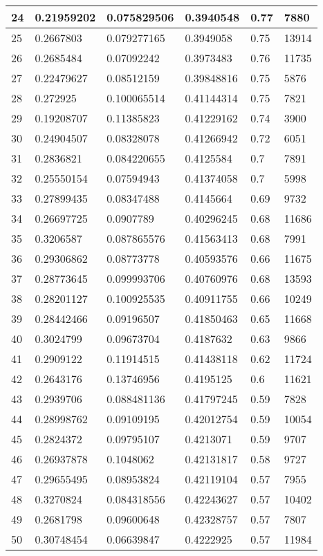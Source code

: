 \begin{longtable}{|l|l|l|l|l|l|}
24 & 0.21959202 & 0.075829506 & 0.3940548 & 0.77 & 7880 \\ \hline 
25 & 0.2667803 & 0.079277165 & 0.3949058 & 0.75 & 13914 \\ \hline 
26 & 0.2685484 & 0.07092242 & 0.3973483 & 0.76 & 11735 \\ \hline 
27 & 0.22479627 & 0.08512159 & 0.39848816 & 0.75 & 5876 \\ \hline 
28 & 0.272925 & 0.100065514 & 0.41144314 & 0.75 & 7821 \\ \hline 
29 & 0.19208707 & 0.11385823 & 0.41229162 & 0.74 & 3900 \\ \hline 
30 & 0.24904507 & 0.08328078 & 0.41266942 & 0.72 & 6051 \\ \hline 
31 & 0.2836821 & 0.084220655 & 0.4125584 & 0.7 & 7891 \\ \hline 
32 & 0.25550154 & 0.07594943 & 0.41374058 & 0.7 & 5998 \\ \hline 
33 & 0.27899435 & 0.08347488 & 0.4145664 & 0.69 & 9732 \\ \hline 
34 & 0.26697725 & 0.0907789 & 0.40296245 & 0.68 & 11686 \\ \hline 
35 & 0.3206587 & 0.087865576 & 0.41563413 & 0.68 & 7991 \\ \hline 
36 & 0.29306862 & 0.08773778 & 0.40593576 & 0.66 & 11675 \\ \hline 
37 & 0.28773645 & 0.099993706 & 0.40760976 & 0.68 & 13593 \\ \hline 
38 & 0.28201127 & 0.100925535 & 0.40911755 & 0.66 & 10249 \\ \hline 
39 & 0.28442466 & 0.09196507 & 0.41850463 & 0.65 & 11668 \\ \hline 
40 & 0.3024799 & 0.09673704 & 0.4187632 & 0.63 & 9866 \\ \hline 
41 & 0.2909122 & 0.11914515 & 0.41438118 & 0.62 & 11724 \\ \hline 
42 & 0.2643176 & 0.13746956 & 0.4195125 & 0.6 & 11621 \\ \hline 
43 & 0.2939706 & 0.088481136 & 0.41797245 & 0.59 & 7828 \\ \hline 
44 & 0.28998762 & 0.09109195 & 0.42012754 & 0.59 & 10054 \\ \hline 
45 & 0.2824372 & 0.09795107 & 0.4213071 & 0.59 & 9707 \\ \hline 
46 & 0.26937878 & 0.1048062 & 0.42131817 & 0.58 & 9727 \\ \hline 
47 & 0.29655495 & 0.08953824 & 0.42119104 & 0.57 & 7955 \\ \hline 
48 & 0.3270824 & 0.084318556 & 0.42243627 & 0.57 & 10402 \\ \hline 
49 & 0.2681798 & 0.09600648 & 0.42328757 & 0.57 & 7807 \\ \hline 
50 & 0.30748454 & 0.06639847 & 0.4222925 & 0.57 & 11984 \\ \hline 
\end{longtable}